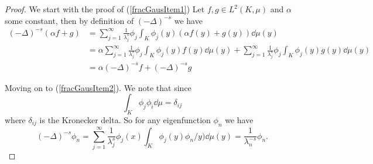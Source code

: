 \begin{proof}
	
	We start with the proof of (\ref{fracGausItem1})
	Let $f,g \in L^{2}(K, \mu)$ and $\alpha$ some constant, then by definition of $(-\Delta)^{-s}$ we have
	\begin{align}
		(-\Delta)^{-s}(\alpha f + g) &= \sum_{j = 1}^{\infty} \frac{1}{\lambda_{j}^{s}} \phi_j \int_{K} \phi_j(y)(\alpha f(y) + g(y)) \dd \mu(y)\\
		& = \alpha \sum_{j = 1}^{\infty} \frac{1}{\lambda_{j}^{s}} \phi_j \int_{K} \phi_j(y)f(y)  \dd \mu(y) + \sum_{j = 1}^{\infty} \frac{1}{\lambda_{j}^{s}} \phi_j \int_{K} \phi_j(y)g(y) \dd \mu(y) \\
		&=\alpha (-\Delta)^{-s}f + (-\Delta)^{-s}g
	\end{align}
	
	Moving on to (\ref{fracGausItem2}). We note that since
	\begin{equation}
		\int_{K}\phi_j \phi_i \dd \mu = \delta_{ij}
	\end{equation}
	where $\delta_{ij}$ is the Kronecker delta. So for any eigenfunction $\phi_n$ we have
	\begin{equation}
		(-\Delta)^{-s}\phi_n = \sum_{j = 1}^{\infty} \frac{1}{\lambda_{j}^{s}} \phi_j(x) \int_{K}\phi_j(y)\phi_n/y) \dd \mu(y) = \frac{1}{\lambda_{n}^{-s}}\phi_{n}.
	\end{equation}
	

\end{proof}
